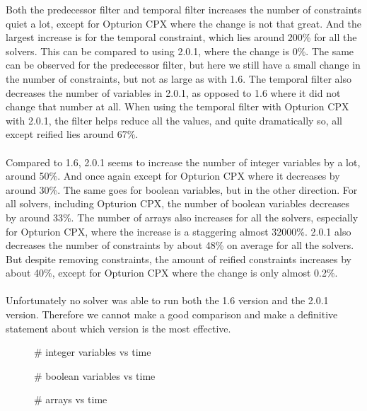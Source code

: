 Both the predecessor filter and temporal filter increases the number of constraints quiet a lot, except for Opturion CPX where the change is not that great. And the largest increase is for the temporal constraint, which lies around 200\% for all the solvers. This can be compared to using 2.0.1, where the change is 0\%. The same can be observed for the predecessor filter, but here we still have a small change in the number of constraints, but not as large as with 1.6. The temporal filter also decreases the number of variables in 2.0.1, as opposed to 1.6 where it did not change that number at all. When using the temporal filter with Opturion CPX with 2.0.1, the filter helps reduce all the values, and quite dramatically so, all except reified lies around 67\%.
\\\\
Compared to 1.6, 2.0.1 seems to increase the number of integer variables by a lot, around 50\%. And once again except for Opturion CPX where it decreases by around 30\%. The same goes for boolean variables, but in the other direction. For all solvers, including Opturion CPX, the number of boolean variables decreases by around 33\%. The number of arrays also increases for all the solvers, especially for Opturion CPX, where the increase is a staggering almost 32000\%. 2.0.1 also decreases the number of constraints by about 48\% on average for all the solvers. But despite removing constraints, the amount of reified constraints increases by about 40\%, except for Opturion CPX where the change is only almost 0.2\%.
\\\\
Unfortunately no solver was able to run both the 1.6 version and the 2.0.1 version. Therefore we cannot make a good comparison and make a definitive statement about which version is the most effective.

\begin{figure}[H]
\centering

\caption{\# integer variables vs time}
\label{fig:int_vs_time}
\end{figure}

\begin{figure}[H]
\centering

\caption{\# boolean variables vs time}
\label{fig:bool_vs_time}
\end{figure}

\begin{figure}[H]
\centering

\caption{\# arrays vs time}
\label{fig:arr_vs_time}
\end{figure}

